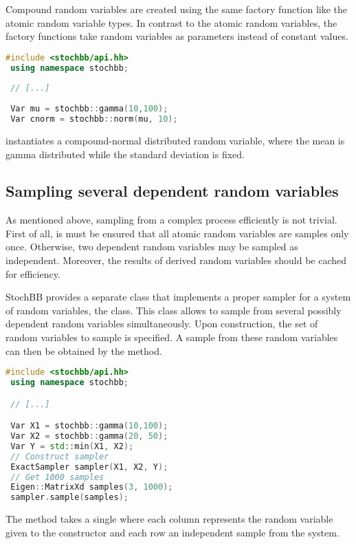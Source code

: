 Compound random variables are created using the same factory function like the atomic random variable
types. In contrast to the atomic random variables, the factory functions take random variables as 
parameters instead of constant values.
\begin{lstlisting}[language=C++]
 #include <stochbb/api.hh>
 using namespace stochbb;
 
 // [...]
 
 Var mu = stochbb::gamma(10,100);
 Var cnorm = stochbb::norm(mu, 10);
\end{lstlisting}
instantiates a compound-normal distributed random variable, where the mean is gamma distributed
while the standard deviation is fixed.

\subsection{Sampling several dependent random variables}
As mentioned above, sampling from a complex process efficiently is not trivial. First of all, is
must be ensured that all atomic random variables are samples only once. Otherwise, two dependent
random variables may be sampled as independent. Moreover, the results of derived random variables
should be cached for efficiency. 

StochBB provides a separate class that implements a proper
sampler for a system of random variables, the  class. This class allows to
sample from several possibly dependent random variables simultaneously. Upon construction, the
set of random variables to sample is specified. A sample from these random variables can then be
obtained by the  method.
\begin{lstlisting}[language=C++]
 #include <stochbb/api.hh>
 using namespace stochbb;

 // [...]

 Var X1 = stochbb::gamma(10,100);
 Var X2 = stochbb::gamma(20, 50);
 Var Y = std::min(X1, X2);
 // Construct sampler
 ExactSampler sampler(X1, X2, Y);
 // Get 1000 samples
 Eigen::MatrixXd samples(3, 1000);
 sampler.sample(samples);
\end{lstlisting}

The  method takes a single  where each column
represents the random variable given to the constructor and each row an independent sample from
the system.

